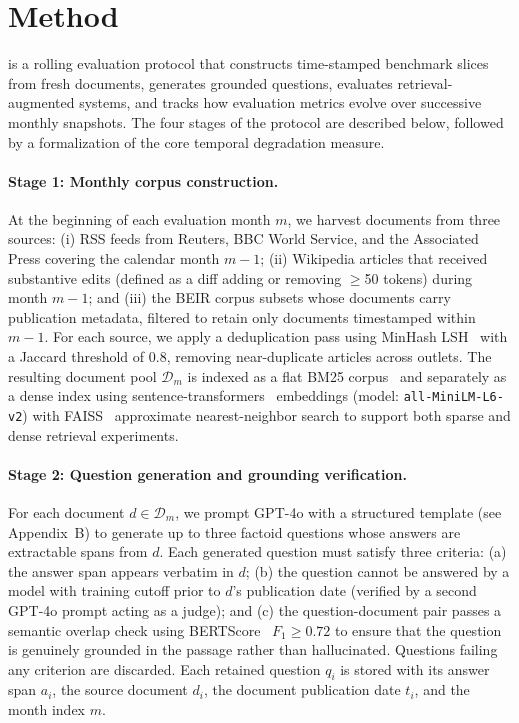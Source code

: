 \section{Method}
\label{sec:method}

\method{} is a rolling evaluation protocol that constructs time-stamped benchmark slices from fresh documents, generates grounded questions, evaluates retrieval-augmented systems, and tracks how evaluation metrics evolve over successive monthly snapshots. The four stages of the protocol are described below, followed by a formalization of the core temporal degradation measure.

\paragraph{Stage 1: Monthly corpus construction.}
At the beginning of each evaluation month $m$, we harvest documents from three sources: (i) RSS feeds from Reuters, BBC World Service, and the Associated Press covering the calendar month $m{-}1$; (ii) Wikipedia articles that received substantive edits (defined as a diff adding or removing $\geq$50 tokens) during month $m{-}1$; and (iii) the BEIR corpus subsets whose documents carry publication metadata, filtered to retain only documents timestamped within $m{-}1$. For each source, we apply a deduplication pass using MinHash LSH~\citep{leskovec2020minhash} with a Jaccard threshold of 0.8, removing near-duplicate articles across outlets. The resulting document pool $\mathcal{D}_m$ is indexed as a flat BM25 corpus~\citep{robertson2009bm25} and separately as a dense index using sentence-transformers~\citep{reimers2019sentencetransformers} embeddings (model: \mbox{\texttt{all-MiniLM-L6-v2}}) with FAISS~\citep{johnson2021faiss} approximate nearest-neighbor search to support both sparse and dense retrieval experiments.

\paragraph{Stage 2: Question generation and grounding verification.}
For each document $d \in \mathcal{D}_m$, we prompt GPT-4o with a structured template (see Appendix~B) to generate up to three factoid questions whose answers are extractable spans from $d$. Each generated question must satisfy three criteria: (a) the answer span appears verbatim in $d$; (b) the question cannot be answered by a model with training cutoff prior to $d$'s publication date (verified by a second GPT-4o prompt acting as a judge); and (c) the question-document pair passes a semantic overlap check using BERTScore~\citep{zhang2020bertscore} $F_1 \geq 0.72$ to ensure that the question is genuinely grounded in the passage rather than hallucinated. Questions failing any criterion are discarded. Each retained question $q_i$ is stored with its answer span $a_i$, the source document $d_i$, the document publication date $t_i$, and the month index $m$.

